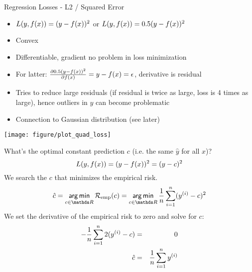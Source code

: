 \documentclass[11pt,compress,t,notes=noshow, xcolor=table]{beamer}
\newenvironment{knitrout}{}{} %
\begin{document}
\begin{vbframe}{Regression Losses - L2 / Squared Error}
\begin{itemize}
\item $L(y, f(x)) = (y-f(x))^2$ or $L(y, f(x)) = 0.5 (y-f(x))^2$
\item Convex
\item Differentiable, gradient no problem in loss minimization
\item For latter: $\frac{\partial{0.5 (y-f(x))^2}}{\partial f(x)} = y - f(x) = \epsilon$, derivative is residual
\item Tries to reduce large residuals (if residual is twice as large, loss is 4 times as large), hence
  outliers in $y$ can become problematic
\item Connection to Gaussian distribution (see later)
\end{itemize}

\begin{knitrout}\scriptsize
{}\color{fgcolor}

{\centering \texttt{[image: figure/plot\_quad\_loss]} 
}



\end{knitrout}
\framebreak


What's the optimal constant prediction $c$ (i.e. the same $\hat{y}$ for all $x$)?
$$L(y, f(x)) = (y-f(x))^2 = (y - c)^2$$
We search the $c$ that minimizes the empirical risk.
$$  \hat{c} = \argmin_{c \in \R}\riske(c)  =  \argmin_{c \in \R} \frac{1}{n} \sumin  (\yi-c)^2 $$
We set the derivative of the empirical risk to zero and solve for $c$:
\begin{eqnarray*}
 -\frac{1}{n}\sum_{i=1}^n 2(y^{(i)} - c) &=& 0 \cr
\hat{c} &=& \frac{1}{n} \sum_{i=1}^n y^{(i)}
\end{eqnarray*}

%
%
\end{vbframe}
\end{document}
